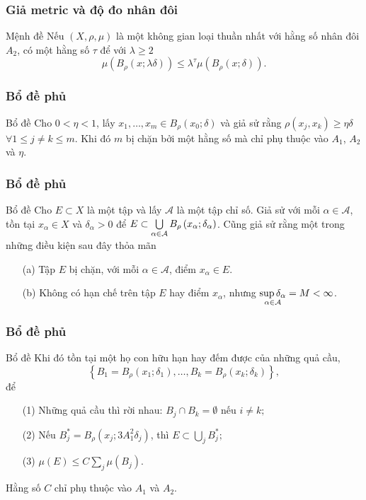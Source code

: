 \documentclass[11pt]{beamer}
\numberwithin{equation}{section}
\theoremstyle{plain}
\theoremstyle{definition}
\theoremstyle{remark}
\begin{document}
\begin{frame}\frametitle{Giả metric và độ đo nhân đôi}
\begin{block}{Mệnh đề}
Nếu $\left(X,\rho,\mu\right)$ là một không gian loại thuần nhất với hằng số nhân đôi $A_{2}$, có một hằng số $\tau$ để với $\lambda\ge 2$
\[\mu\left(B_{\rho}\left(x;\lambda\delta\right)\right)\le \lambda^{\tau}\mu\left(B_{\rho}\left(x;\delta\right)\right).\]
\end{block}
\end{frame}

\begin{frame}\frametitle{Bổ đề phủ}
\begin{block}{Bổ đề}
Cho $0<\eta<1$, lấy $x_{1},\ldots,x_{m}\in B_{\rho}\left(x_{0};\delta\right)$ và giả sử rằng $\rho\left(x_{j},x_{k}\right)\ge\eta\delta$ $\forall 1\le j\neq k\le m$. Khi đó $m$ bị chặn bởi một hằng số mà chỉ phụ thuộc vào $A_{1}$, $A_{2}$ và $\eta$.
\end{block}
\end{frame}
\begin{frame}\frametitle{Bổ đề phủ}
\begin{block}{Bổ đề}
Cho $E\subset X$ là một tập và lấy $\mathcal{A}$ là một tập chỉ số. Giả sử với mỗi $\alpha\in \mathcal{A}$, tồn tại $x_{\alpha}\in X$ và $\delta_{\alpha}>0$ để $E \subset \bigcup\limits_{\alpha  \in {\cal A}} {{B_\rho }\left( {{x_\alpha };{\delta _\alpha }} \right)}$. Cũng giả sử rằng một trong những điều kiện sau đây thỏa mãn
\begin{itemize}
\item[(a)] Tập $E$ bị chặn, với mỗi $\alpha\in\mathcal{A}$, điểm $x_{\alpha}\in E$.
\item[(b)] Không có hạn chế trên tập $E$ hay điểm $x_{\alpha}$, nhưng $\mathop {\sup {\delta _\alpha }}\limits_{\alpha  \in {\cal A}}  = M < \infty$.\\
\end{itemize}
\end{block}
\end{frame}
\begin{frame}\frametitle{Bổ đề phủ}
\begin{block}{Bổ đề}
Khi đó tồn tại một họ con hữu hạn hay đếm được của những quả cầu,
\[\left\{ {{B_1} = {B_\rho }\left( {{x_1};{\delta _1}} \right), \ldots ,{B_k} = {B_\rho }\left( {{x_k};{\delta _k}} \right)} \right\},\]
để 
\begin{itemize}
\item[(1)] Những quả cầu thì rời nhau: $B_{j}\cap B_{k}=\emptyset$ nếu $i\neq k;$
\item[(2)] Nếu $B_j^* = {B_\rho }\left( {{x_j};3A_1^2{\delta _j}} \right)$, thì $E \subset \bigcup\limits_j {B_j^*} ;$
\item[(3)] $\mu \left( E \right) \le C\sum\limits_j {\mu \left( {{B_j}} \right)} .$
\end{itemize}
Hằng số $C$ chỉ phụ thuộc vào $A_{1}$ và $A_{2}$.
\end{block}
\end{frame}
\end{document}
